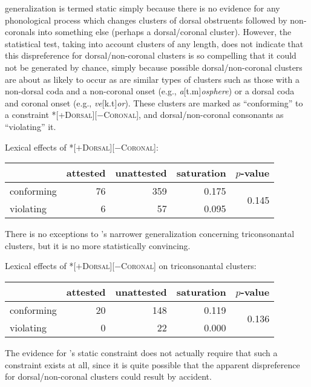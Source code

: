 \citeauthor{Pierrehumbert1994} generalization is termed static simply because there is no evidence for any phonological process which changes clusters of dorsal obstruents followed by non-coronals into something else (perhaps a dorsal/coronal cluster). However, the statistical test, taking into account clusters of any length, does not indicate that this dispreference for dorsal/non-coronal clusters is so compelling that it could not be generated by chance, simply because possible dorsal/non-coronal clusters are about as likely to occur as are similar types of clusters such as those with a non-dorsal coda and a non-coronal onset (e.g., \emph{a}[t.m]\emph{osphere}) or a dorsal coda and coronal onset (e.g., \emph{ve}[k.t]\emph{or}). These clusters are marked as ``conforming'' to a constraint \textsc{*[+Dorsal][$-$Coronal]}, and dorsal/non-coronal consonants as ``violating'' it. 

\ex Lexical effects of \textsc{*[$+$Dorsal][$-$Coronal]}: \vspace{6pt} \\
\begin{tabular}{l r r r r}
\toprule
           & attested & unattested & saturation & $p$-value \\
\midrule
conforming & 76 & 359 & 0.175 & \multirow{2}{*}{0.145} \\
violating  &  6 &  57 & 0.095 \\
\bottomrule
\end{tabular}
\xe

There is no exceptions to \citeauthor{Pierrehumbert1994}'s narrower generalization concerning triconsonantal clusters, but it is no more statistically convincing. 

\ex Lexical effects of \textsc{*[$+$Dorsal][$-$Coronal]} on triconsonantal clusters: \vspace{6pt} \\
\begin{tabular}{l r r r r}
\toprule
           & attested & unattested & saturation & $p$-value \\
\midrule
conforming & 20 & 148 & 0.119 & \multirow{2}{*}{0.136} \\
violating  &  0 &  22 & 0.000 \\
\bottomrule
\end{tabular}
\xe

\noindent
The evidence for \citeauthor{Pierrehumbert1994}'s static constraint does not actually require that such a constraint exists at all, since it is quite possible that the apparent dispreference for dorsal/non-coronal clusters could result by accident.


